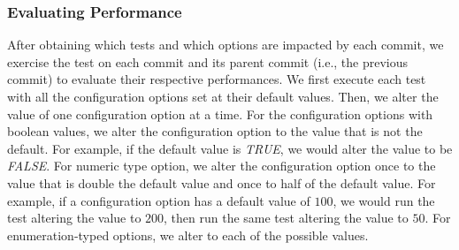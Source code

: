 

\subsubsection{Evaluating Performance}
\label{evaluation}
After obtaining which tests and which options are impacted by each commit, we exercise the test on each commit and its parent commit (i.e., the previous commit) to evaluate their respective performances. %
We first execute each test with all the configuration options set at their default values. Then, we alter the value of one configuration option at a time. For the configuration options with boolean values, we alter the configuration option to the value that is not the default. For example, if the default value is \emph{TRUE}, we would alter the value to be \emph{FALSE}. For numeric type option, we alter the configuration option once to the value that is double the default value and once to half of the default value. For example, if a configuration option has a default value of $100$, we would run the test altering the value to $200$, then run the same test altering the value to $50$. %
For enumeration-typed options, we alter to each of the possible values.%

